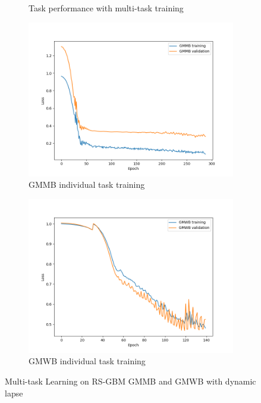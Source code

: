 \begin{figure}[ht!]
\begin{subfigure}{0.48\textwidth}
        \caption{Task performance with multi-task training}
        \label{subfig3-5:fineTuning}
    \end{subfigure}
    \begin{subfigure}{0.48\textwidth}
        \includegraphics[width=\textwidth]{./project3/figures/figure5c.png}
        \caption{GMMB individual task training} 
    \label{subfig3-5:gmmb_individual}
    \end{subfigure}\hfill
    \begin{subfigure}{0.48\textwidth}
        \includegraphics[width=\textwidth]{./project3/figures/figure5d.png}
        \caption{GMWB individual task training}
        \label{subfig3-5:gmwb_individual}
    \end{subfigure}
    \caption{Multi-task Learning on RS-GBM GMMB and GMWB with dynamic lapse}
    \label{fig3:figure5}
\end{figure}


